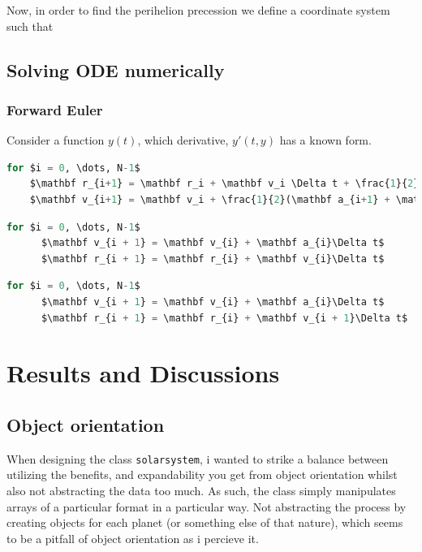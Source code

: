 \documentclass[10pt,showpacs,preprintnumbers,footinbib,amsmath,amssymb,aps,prl,twocolumn,groupedaddress,superscriptaddress,showkeys]{revtex4-1}
\begin{document}
      Now, in order to find the perihelion precession we define a coordinate system such that 

\subsection{Solving ODE numerically}
  \subsubsection{Forward Euler}
    Consider a function $y(t)$, which derivative, $y'(t, y)$ has a known form.

  \begin{lstlisting}[mathescape=true, language=python, title=Velocity-Verlet Algorithm]
  for $i = 0, \dots, N-1$
    $\mathbf r_{i+1} = \mathbf r_i + \mathbf v_i \Delta t + \frac{1}{2}\mathbf a_i(\Delta t)^2$
    $\mathbf v_{i+1} = \mathbf v_i + \frac{1}{2}(\mathbf a_{i+1} + \mathbf a_i)\Delta t  $
  \end{lstlisting}

    \begin{lstlisting}[mathescape=true, language=python, title=Forward Euler Algorithm]
  for $i = 0, \dots, N-1$
      $\mathbf v_{i + 1} = \mathbf v_{i} + \mathbf a_{i}\Delta t$
      $\mathbf r_{i + 1} = \mathbf r_{i} + \mathbf v_{i}\Delta t$
  \end{lstlisting}

  \begin{lstlisting}[mathescape=true, language=python, title=Euler-Cromer Algorithm]
  for $i = 0, \dots, N-1$
      $\mathbf v_{i + 1} = \mathbf v_{i} + \mathbf a_{i}\Delta t$
      $\mathbf r_{i + 1} = \mathbf r_{i} + \mathbf v_{i + 1}\Delta t$
  \end{lstlisting}

\section{Results and Discussions}
  \subsection{Object orientation}
    When designing the class \lstinline{solarsystem}, i wanted to strike a balance between utilizing the benefits, and expandability you get from object orientation whilst also not abstracting the data too much. As such, the class simply manipulates arrays of a particular format in a particular way. Not abstracting the process by creating objects for each planet (or something else of that nature), which seems to be a pitfall of object orientation as i percieve it.
\end{document}
